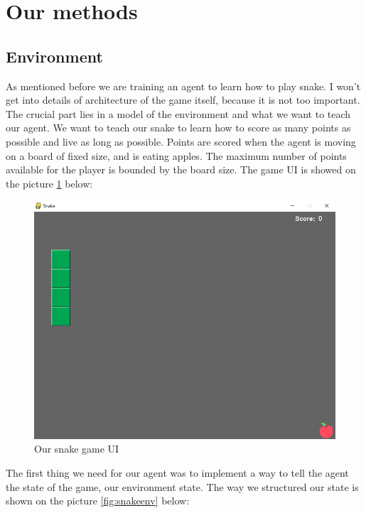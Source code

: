 \documentclass[]{article}
\begin{document}
\section{Our methods}

\subsection{Environment}

\par As mentioned before we are training an agent to learn how to play snake. I won't get into details of architecture of the game itself, because it is not too important. The crucial part lies in a model of the environment and what we want to teach our agent. We want to teach our snake to learn how to score as many points as possible and live as long as possible. Points are scored when the agent is moving on a board of fixed size, and is eating apples. The maximum number of points available for the player is bounded by the board size. The game UI is showed on the picture \ref{fig:snake} below:

\begin{figure}[h]
	\centering
	\includegraphics[scale=0.3]{snake}
	\caption{Our snake game UI}
	\label{fig:snake}
\end{figure}

\par The first thing we need for our agent was to implement a way to tell the agent the state of the game, our environment state. The way we structured our state is shown on the picture \ref{fig:snakeenv} below:
\end{document}
